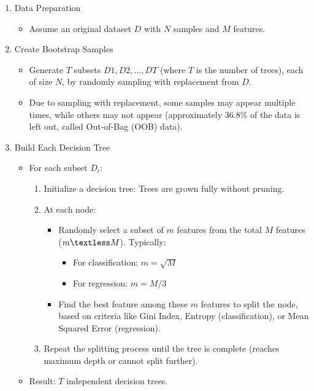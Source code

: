\begin{enumerate}[label=Step \arabic*:, align=left, leftmargin=20pt,labelsep=1em]
    \item Data Preparation
    \begin{itemize}
        \item Assume an original dataset $D$ with $N$ samples and $M$ features.
    \end{itemize}

    \item Create Bootstrap Samples
    \begin{itemize}
        \item Generate $T$ subsets $D1, D2, \ldots,DT$ (where $T$ is the number of trees), each of size $N$, by randomly sampling with replacement from $D$.
        \item Due to sampling with replacement, some samples may appear multiple times, while others may not appear (approximately 36.8\% of the data is left out, called Out-of-Bag (OOB) data).
    \end{itemize}

    \item Build Each Decision Tree
    \begin{itemize}
        \item For each subset $D_t$:
        \begin{enumerate}
            \item Initialize a decision tree: Trees are grown fully without pruning.
            \item At each node:
            \begin{itemize}
                \item Randomly select a subset of $m$ features from the total $M$ features ($m \textless M$). Typically:
                \begin{itemize}
                    \item For classification: $m = \sqrt{M}$
                    \item For regression: $m = M/3$
                \end{itemize}
                \item Find the best feature among these $m$ features to split the node, based on criteria like Gini Index, Entropy (classification), or Mean Squared Error (regression).
            \end{itemize}
            \item Repeat the splitting process until the tree is complete (reaches maximum depth or cannot split further).
        \end{enumerate}
        \item Result: $T$ independent decision trees.
    \end{itemize}


\end{enumerate}
